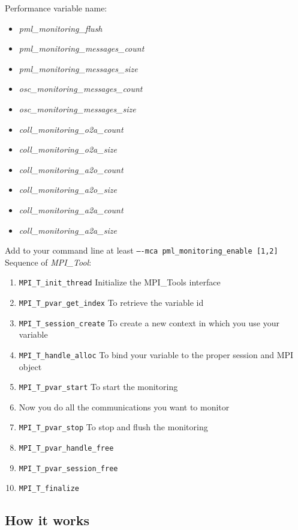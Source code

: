 \documentclass[notitlepage]{article}
\newcommand{\mpit}[1]{\textit{MPI\_Tool#1}}
\begin{document}
Performance variable name:
\begin{itemize}
\item \textit{pml\_monitoring\_flush}
\item \textit{pml\_monitoring\_messages\_count}
\item \textit{pml\_monitoring\_messages\_size}
\item \textit{osc\_monitoring\_messages\_count}
\item \textit{osc\_monitoring\_messages\_size}
\item \textit{coll\_monitoring\_o2a\_count}
\item \textit{coll\_monitoring\_o2a\_size}
\item \textit{coll\_monitoring\_a2o\_count}
\item \textit{coll\_monitoring\_a2o\_size}
\item \textit{coll\_monitoring\_a2a\_count}
\item \textit{coll\_monitoring\_a2a\_size}
\end{itemize}
Add to your command line at least \texttt{----mca pml\_monitoring\_enable [1,2]} \\
Sequence of \mpit{}:
\begin{enumerate}
\item {\texttt{MPI\_T\_init\_thread}} Initialize the MPI\_Tools
  interface
\item {\texttt{MPI\_T\_pvar\_get\_index}} To retrieve the variable id
\item {\texttt{MPI\_T\_session\_create}} To create a new context
  in which you use your variable
\item {\texttt{MPI\_T\_handle\_alloc}} To bind your variable to the
  proper session and MPI object
\item {\texttt{MPI\_T\_pvar\_start}} To start the monitoring
\item Now you do all the communications you want to monitor
\item {\texttt{MPI\_T\_pvar\_stop}} To stop and flush the monitoring
\item {\texttt{MPI\_T\_pvar\_handle\_free}}
\item {\texttt{MPI\_T\_pvar\_session\_free}}
\item {\texttt{MPI\_T\_finalize}}
\end{enumerate}

\subsection{How it works}
\end{document}
